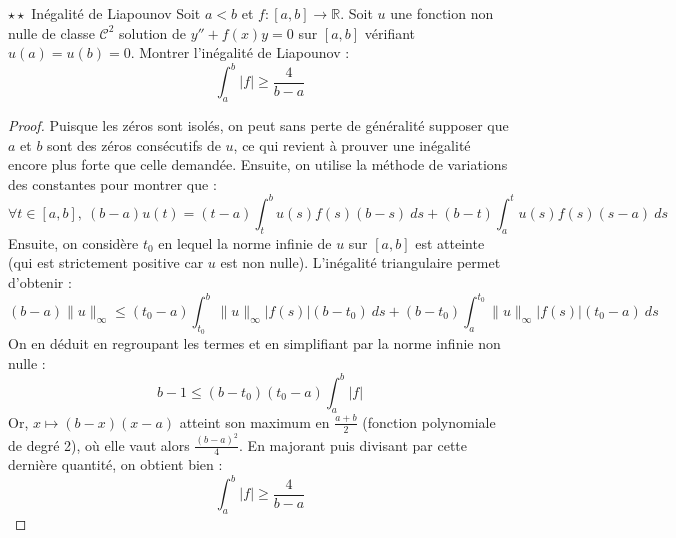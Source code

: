 \documentclass[french,a4paper]{article}
\newcommand{\R}{\mathbb{R}}
\theoremstyle{plain}
\theoremstyle{definition}
\theoremstyle{remark}
\begin{document}
\begin{ex}[X]{$\star\star$ Inégalité de Liapounov}
	Soit $a<b$ et $f:[a,b]\to\R$. Soit $u$ une fonction non nulle de classe $\mathcal{C}^2$ solution de $y''+f(x)y=0$ sur $[a,b]$ vérifiant $u(a)=u(b)=0$. Montrer l'inégalité de Liapounov : $$\int_{a}^{b}\lvert f\rvert \geqslant\frac{4}{b-a}$$
\end{ex}
\begin{proof}
	Puisque les zéros sont isolés, on peut sans perte de généralité supposer que $a$ et $b$ sont des zéros consécutifs de $u$, ce qui revient à prouver une inégalité encore plus forte que celle demandée. Ensuite, on utilise la méthode de variations des constantes pour montrer que : $$\forall t\in[a,b],\ (b-a)u(t)=(t-a)\int_{t}^{b}u(s)f(s)(b-s)\ ds+(b-t)\int_{a}^{t}u(s)f(s)(s-a)\ ds$$ Ensuite, on considère $t_0$ en lequel la norme infinie de $u$ sur $[a,b]$ est atteinte (qui est strictement positive car $u$ est non nulle). L'inégalité triangulaire permet d'obtenir : $$(b-a)\lVert u\rVert_\infty\leqslant (t_0-a)\int_{t_0}^{b}\lVert u\rVert_\infty \lvert f(s)\rvert (b-t_0)\ ds+(b-t_0)\int_{a}^{t_0}\lVert u\rVert_\infty \lvert f(s)\rvert (t_0-a)\ ds$$ On en déduit en regroupant les termes et en simplifiant par la norme infinie non nulle : $$b-1\leqslant (b-t_0)(t_0-a)\int_{a}^{b}\lvert f\rvert$$ Or, $x\mapsto (b-x)(x-a)$ atteint son maximum en $\displaystyle\frac{a+b}{2}$ (fonction polynomiale de degré 2), où elle vaut alors $\displaystyle\frac{(b-a)^2}{4}$. En majorant puis divisant par cette dernière quantité, on obtient bien : $$\int_{a}^{b}\lvert f\rvert \geqslant\frac{4}{b-a}$$
\end{proof}
\end{document}
